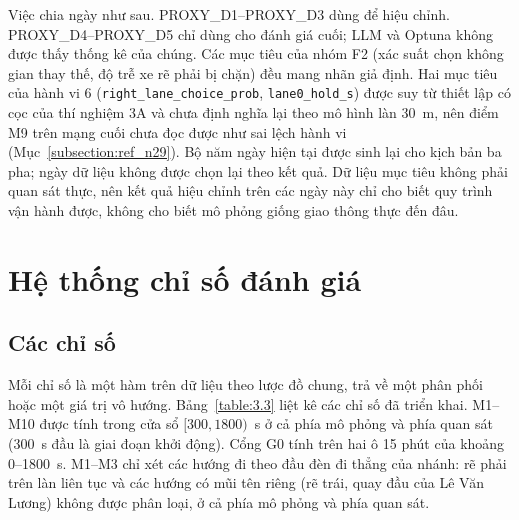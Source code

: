 \documentclass[../DoAn.tex]{subfiles}
\begin{document}
Việc chia ngày như sau. PROXY\_D1--PROXY\_D3 dùng để hiệu chỉnh. PROXY\_D4--PROXY\_D5 chỉ dùng cho đánh giá cuối; LLM và Optuna không được thấy thống kê của chúng. Các mục tiêu của nhóm F2 (xác suất chọn không gian thay thế, độ trễ xe rẽ phải bị chặn) đều mang nhãn giả định. Hai mục tiêu của hành vi 6 (\texttt{right\_lane\_choice\_prob}, \texttt{lane0\_hold\_s}) được suy từ thiết lập có cọc của thí nghiệm 3A và chưa định nghĩa lại theo mô hình làn 30~m, nên điểm M9 trên mạng cuối chưa đọc được như sai lệch hành vi (Mục~\ref{subsection:ref_n29}). Bộ năm ngày hiện tại được sinh lại cho kịch bản ba pha; ngày dữ liệu không được chọn lại theo kết quả. Dữ liệu mục tiêu không phải quan sát thực, nên kết quả hiệu chỉnh trên các ngày này chỉ cho biết quy trình vận hành được, không cho biết mô phỏng giống giao thông thực đến đâu.

\section{Hệ thống chỉ số đánh giá}
\label{section:3.7}

\subsection{Các chỉ số}

Mỗi chỉ số là một hàm trên dữ liệu theo lược đồ chung, trả về một phân phối hoặc một giá trị vô hướng. Bảng~\ref{table:3.3} liệt kê các chỉ số đã triển khai. M1--M10 được tính trong cửa sổ $[300, 1800)$~s ở cả phía mô phỏng và phía quan sát (300~s đầu là giai đoạn khởi động). Cổng G0 tính trên hai ô 15 phút của khoảng 0--1800~s. M1--M3 chỉ xét các hướng đi theo đầu đèn đi thẳng của nhánh: rẽ phải trên làn liên tục và các hướng có mũi tên riêng (rẽ trái, quay đầu của Lê Văn Lương) không được phân loại, ở cả phía mô phỏng và phía quan sát.
\end{document}
